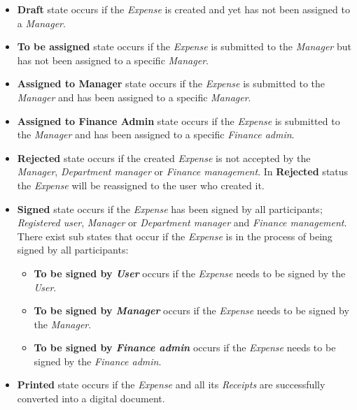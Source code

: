 \begin{itemize}
    \item \textbf{Draft} state occurs if the \textit{Expense} is created and yet has not been assigned to a \textit{Manager}.
    
    \item \textbf{To be assigned} state occurs if the \textit{Expense} is submitted to the \textit{Manager} but has not been assigned to a specific \textit{Manager}.
    
    \item \textbf{Assigned to Manager} state occurs if the \textit{Expense} is submitted to the \textit{Manager} and has been assigned to a specific \textit{Manager}.
    
    \item \textbf{Assigned to Finance Admin} state occurs if the \textit{Expense} is submitted to the \textit{Manager} and has been assigned to a specific \textit{Finance admin}.
    
    \item \textbf{Rejected} state occurs if the created \textit{Expense} is not accepted by the \textit{Manager}, \textit{Department manager} or \textit{Finance management}. In \textbf{Rejected} status the \textit{Expense} will be reassigned to the user who created it.
    
    \item \textbf{Signed} state occurs if the \textit{Expense} has been signed by all participants; \textit{Registered user}, \textit{Manager} or \textit{Department manager} and \textit{Finance management}. There exist sub states that occur if the \textit{Expense} is in the process of being signed by all participants:
        \begin{itemize}
            \item \textbf{To be signed by \textit{User}} occurs if the \textit{Expense} needs to be signed by the \textit{User}.
            \item \textbf{To be signed by \textit{Manager}} occurs if the \textit{Expense} needs to be signed by the \textit{Manager}.
            \item \textbf{To be signed by \textit{Finance admin}} occurs if the \textit{Expense} needs to be signed by the \textit{Finance admin}.
        \end{itemize}
    
    \item \textbf{Printed} state occurs if the \textit{Expense} and all its \textit{Receipts} are successfully converted into a digital document.
    
\end{itemize}

